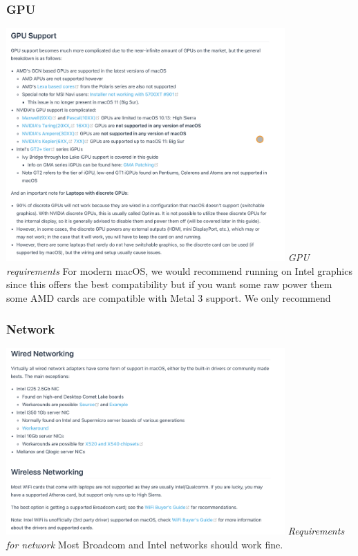 \documentclass[12pt, letterpaper]{article}
\begin{document}
\subsubsection{GPU}
\includegraphics[width=0.8\textwidth]{fotos/PSP/Research/Native/Open core req gpu.jpeg}
\break
\emph{GPU requirements}
\hfill\break
\hfill\break
For modern macOS, we would recommend running on Intel graphics since this offers the best compatibility but if you want some raw power them some AMD cards are compatible with Metal 3 support. We only recommend 
\hfill\break
\hfill\break
\subsubsection{Network}
\includegraphics[width=0.8\textwidth]{fotos/PSP/Research/Native/Open core req network.jpeg}
\break
\emph{Requirements for network}
\hfill\break
\hfill\break
Most Broadcom and Intel networks should work fine.
\newpage
\end{document}
